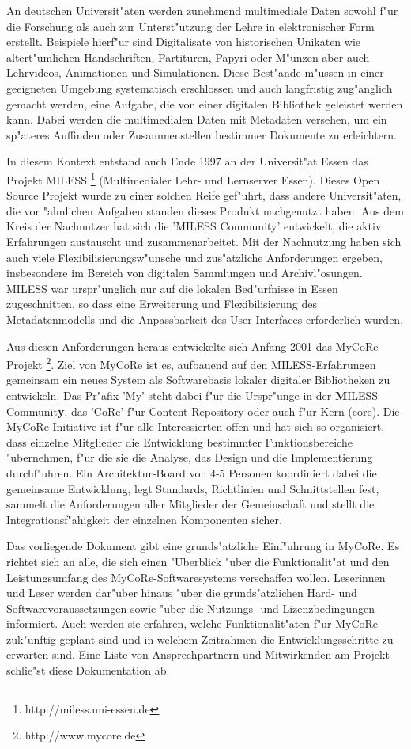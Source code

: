 An deutschen Universit"aten werden zunehmend multimediale Daten sowohl f"ur
die Forschung als auch zur Unterst"utzung der Lehre in elektronischer
Form erstellt.
Beispiele hierf"ur sind Digitalisate von historischen Unikaten wie
altert"umlichen Handschriften, Partituren, Papyri oder M"unzen
aber auch Lehrvideos, Animationen und Simulationen.
Diese Best"ande m"ussen in einer geeigneten Umgebung systematisch
erschlossen und auch langfristig zug"anglich gemacht werden, eine
Aufgabe, die von einer digitalen Bibliothek geleistet werden kann.
Dabei werden die multimedialen Daten mit Metadaten versehen, um ein 
sp"ateres Auffinden oder Zusammenstellen bestimmer Dokumente zu erleichtern.

In diesem Kontext entstand auch Ende 1997 an der Universit"at Essen
das Projekt MILESS \footnote{http://miless.uni-essen.de} (Multimedialer
Lehr- und Lernserver Essen).
Dieses Open Source Projekt wurde zu einer solchen Reife gef"uhrt, dass
andere Universit"aten, die vor "ahnlichen Aufgaben standen dieses Produkt
nachgenutzt haben.
Aus dem Kreis der Nachnutzer hat sich die 'MILESS Community' entwickelt,
die aktiv Erfahrungen austauscht und zusammenarbeitet.
Mit der Nachnutzung haben sich auch viele Flexibilisierungsw"unsche
und zus"atzliche Anforderungen ergeben, insbesondere im Bereich
von digitalen Sammlungen und Archivl"osungen.
MILESS war urspr"unglich nur auf die lokalen Bed"urfnisse in Essen
zugeschnitten, so dass eine Erweiterung und Flexibilisierung 
des Metadatenmodells und die Anpassbarkeit des User Interfaces 
erforderlich wurden.

Aus diesen Anforderungen heraus entwickelte sich Anfang 2001 das
MyCoRe-Projekt \footnote{http://www.mycore.de}. 
Ziel von MyCoRe ist es, aufbauend auf den MILESS-Erfahrungen gemeinsam
ein neues System als Softwarebasis lokaler digitaler Bibliotheken zu
entwickeln.
Das Pr"afix 'My' steht dabei f"ur die Urspr"unge in der {\bf M}ILESS
Communit{\bf y}, das 'CoRe' f"ur Content Repository oder auch f"ur
Kern (core).
Die MyCoRe-Initiative ist f"ur alle Interessierten offen und hat sich
so organisiert, dass einzelne Mitglieder die Entwicklung bestimmter
Funktionsbereiche "ubernehmen, f"ur die sie die Analyse, das Design und
die Implementierung durchf"uhren.
Ein Architektur-Board von 4-5 Personen koordiniert dabei die gemeinsame
Entwicklung, legt Standards, Richtlinien und Schnittstellen fest, sammelt
die Anforderungen aller Mitglieder der Gemeinschaft und stellt die 
Integrationsf"ahigkeit der einzelnen Komponenten sicher.

Das vorliegende Dokument gibt eine grunds"atzliche Einf"uhrung in MyCoRe. 
Es richtet sich an alle, die sich einen "Uberblick "uber die Funktionalit"at und den
Leistungsumfang des MyCoRe-Softwaresystems verschaffen wollen.
Leserinnen und Leser werden dar"uber hinaus "uber die 
grunds"atzlichen Hard- und Softwarevoraussetzungen sowie "uber die
Nutzungs- und Lizenzbedingungen informiert. 
Auch werden sie erfahren, welche Funktionalit"aten f"ur MyCoRe zuk"unftig
geplant sind und in welchem Zeitrahmen die Entwicklungsschritte zu erwarten sind.
Eine Liste von Ansprechpartnern und Mitwirkenden am Projekt schlie"st diese
Dokumentation ab.

